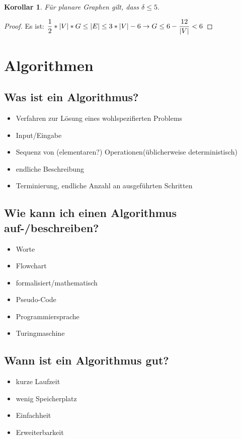 \documentclass[12pt]{article}
\numberwithin{equation}{subsection}
\newtheorem{korollar}{Korollar}
\begin{document}
	\begin{korollar}
		Für planare Graphen gilt, dass $\delta \leq5.$
	\end{korollar}
	\begin{proof}
		Es ist:
		$\dfrac{1}{2}*|V|*G\leq |E|\leq 3*|V|-6\\
		\to G\leq6-\dfrac{12}{|V|}<6$
	\end{proof}

	\section{Algorithmen}
	\subsection{Was ist ein Algorithmus?}
	\begin{itemize}
		\item Verfahren zur Lösung eines wohlspezifierten Problems
		\item Input/Eingabe
		\item Sequenz von (elementaren?) Operationen(üblicherweise deterministisch)
		\item endliche Beschreibung
		\item Terminierung, endliche Anzahl an ausgeführten Schritten
	\end{itemize}
	\subsection{Wie kann ich einen Algorithmus auf-/beschreiben?}
	\begin{itemize}
		\item Worte
		\item Flowchart
		\item formalisiert/mathematisch
		\item Pseudo-Code
		\item Programmiersprache
		\item Turingmaschine
	\end{itemize}
	\subsection{Wann ist ein Algorithmus gut?}
	\begin{itemize}
		\item kurze Laufzeit
		\item wenig Speicherplatz
		\item Einfachheit
		\item Erweiterbarkeit
	\end{itemize}	
\end{document}
